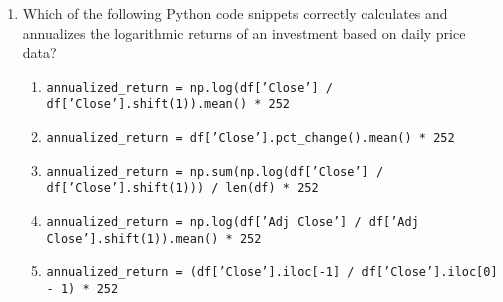 \documentclass{article}
\begin{document}
\begin{enumerate}
    \item Which of the following Python code snippets correctly calculates and annualizes the logarithmic returns of an investment based on daily price data?
    \begin{enumerate}
        \item \texttt{annualized\_return = np.log(df['Close'] / df['Close'].shift(1)).mean() * 252}
        \item \texttt{annualized\_return = df['Close'].pct\_change().mean() * 252}
        \item \texttt{annualized\_return = np.sum(np.log(df['Close'] / df['Close'].shift(1))) / len(df) * 252}
        \item \texttt{annualized\_return = np.log(df['Adj Close'] / df['Adj Close'].shift(1)).mean() * 252}
        \item \texttt{annualized\_return = (df['Close'].iloc[-1] / df['Close'].iloc[0] - 1) * 252}
    \end{enumerate}
\end{enumerate}

\clearpage


\end{document}
